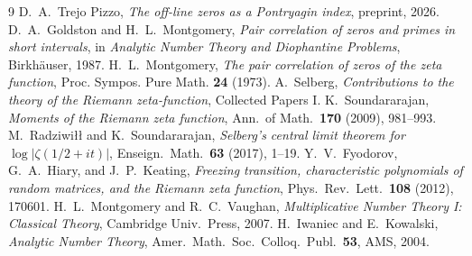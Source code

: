 \documentclass[11pt]{amsart}
\theoremstyle{definition}
\theoremstyle{remark}
\begin{document}
\begin{thebibliography}{9}
 D.~A.~Trejo Pizzo, \emph{The off-line zeros as a Pontryagin index}, preprint, 2026.
 D.~A.~Goldston and H.~L.~Montgomery, \emph{Pair correlation of zeros and primes in short intervals}, in \emph{Analytic Number Theory and Diophantine Problems}, Birkh\"auser, 1987.
 H.~L.~Montgomery, \emph{The pair correlation of zeros of the zeta function}, Proc. Sympos. Pure Math. \textbf{24} (1973).
 A.~Selberg, \emph{Contributions to the theory of the Riemann zeta-function}, Collected Papers I.
 K.~Soundararajan, \emph{Moments of the Riemann zeta function}, Ann.\ of Math.\ \textbf{170} (2009), 981--993.
 M.~Radziwi\l\l{} and K.~Soundararajan, \emph{Selberg's central limit theorem for $\log|\zeta(1/2+it)|$}, Enseign.\ Math.\ \textbf{63} (2017), 1--19.
 Y.~V.~Fyodorov, G.~A.~Hiary, and J.~P.~Keating, \emph{Freezing transition, characteristic polynomials of random matrices, and the Riemann zeta function}, Phys.\ Rev.\ Lett.\ \textbf{108} (2012), 170601.
 H.~L.~Montgomery and R.~C.~Vaughan, \emph{Multiplicative Number Theory I: Classical Theory}, Cambridge Univ.\ Press, 2007.
 H.~Iwaniec and E.~Kowalski, \emph{Analytic Number Theory}, Amer.\ Math.\ Soc.\ Colloq.\ Publ.\ \textbf{53}, AMS, 2004.
\end{thebibliography}
\end{document}
